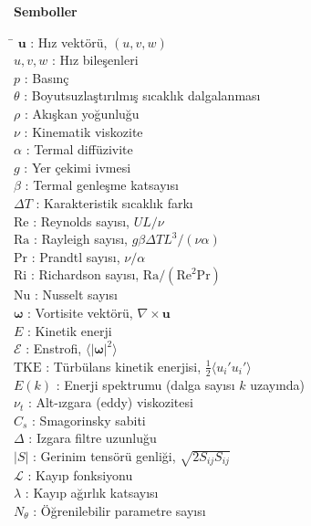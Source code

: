\documentclass[12pt,a4paper]{report}
\begin{document}
\vspace{0.5cm}
\textbf{Semboller}
\begin{tabbing}
\hspace{3cm} \= \kill
$\mathbf{u}$ \> : Hız vektörü, $(u, v, w)$ \\
$u, v, w$ \> : Hız bileşenleri \\
$p$ \> : Basınç \\
$\theta$ \> : Boyutsuzlaştırılmış sıcaklık dalgalanması \\
$\rho$ \> : Akışkan yoğunluğu \\
$\nu$ \> : Kinematik viskozite \\
$\alpha$ \> : Termal diffüzivite \\
$g$ \> : Yer çekimi ivmesi \\
$\beta$ \> : Termal genleşme katsayısı \\
$\Delta T$ \> : Karakteristik sıcaklık farkı \\
$\mathrm{Re}$ \> : Reynolds sayısı, $UL/\nu$ \\
$\mathrm{Ra}$ \> : Rayleigh sayısı, $g\beta\Delta T L^{3}/(\nu\alpha)$ \\
$\mathrm{Pr}$ \> : Prandtl sayısı, $\nu/\alpha$ \\
$\mathrm{Ri}$ \> : Richardson sayısı, $\mathrm{Ra}/(\mathrm{Re}^{2}\mathrm{Pr})$ \\
$\mathrm{Nu}$ \> : Nusselt sayısı \\
$\boldsymbol{\omega}$ \> : Vortisite vektörü, $\nabla\times\mathbf{u}$ \\
$E$ \> : Kinetik enerji \\
$\mathcal{E}$ \> : Enstrofi, $\langle|\boldsymbol{\omega}|^{2}\rangle$ \\
$\mathrm{TKE}$ \> : Türbülans kinetik enerjisi, $\tfrac{1}{2}\langle u_i' u_i'\rangle$ \\
$E(k)$ \> : Enerji spektrumu (dalga sayısı $k$ uzayında) \\
$\nu_{t}$ \> : Alt-ızgara (eddy) viskozitesi \\
$C_{s}$ \> : Smagorinsky sabiti \\
$\Delta$ \> : Izgara filtre uzunluğu \\
$|S|$ \> : Gerinim tensörü genliği, $\sqrt{2 S_{ij}S_{ij}}$ \\
$\mathcal{L}$ \> : Kayıp fonksiyonu \\
$\lambda$ \> : Kayıp ağırlık katsayısı \\
$N_{\theta}$ \> : Öğrenilebilir parametre sayısı \\
\end{tabbing}

\newpage









\end{document}

